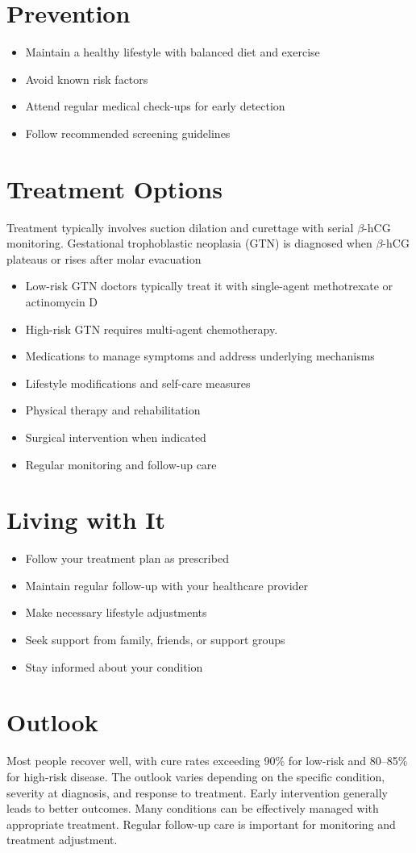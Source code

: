 \section{Prevention}
\begin{itemize}[noitemsep]
  \item Maintain a healthy lifestyle with balanced diet and exercise
  \item Avoid known risk factors
  \item Attend regular medical check-ups for early detection
  \item Follow recommended screening guidelines
\end{itemize}
\section{Treatment Options}
Treatment typically involves suction dilation and curettage with serial $\beta$-hCG monitoring. Gestational trophoblastic neoplasia (GTN) is diagnosed when $\beta$-hCG plateaus or rises after molar evacuation

\begin{itemize}[noitemsep]
  \item Low-risk GTN doctors typically treat it with single-agent methotrexate or actinomycin D
  \item High-risk GTN requires multi-agent chemotherapy.
  \item Medications to manage symptoms and address underlying mechanisms
  \item Lifestyle modifications and self-care measures
  \item Physical therapy and rehabilitation
  \item Surgical intervention when indicated
  \item Regular monitoring and follow-up care
\end{itemize}
\section{Living with It}
\begin{itemize}[noitemsep]
  \item Follow your treatment plan as prescribed
  \item Maintain regular follow-up with your healthcare provider
  \item Make necessary lifestyle adjustments
  \item Seek support from family, friends, or support groups
  \item Stay informed about your condition
\end{itemize}
\section{Outlook}
Most people recover well, with cure rates exceeding 90\% for low-risk and 80--85\% for high-risk disease. The outlook varies depending on the specific condition, severity at diagnosis, and response to treatment. Early intervention generally leads to better outcomes. Many conditions can be effectively managed with appropriate treatment. Regular follow-up care is important for monitoring and treatment adjustment.

